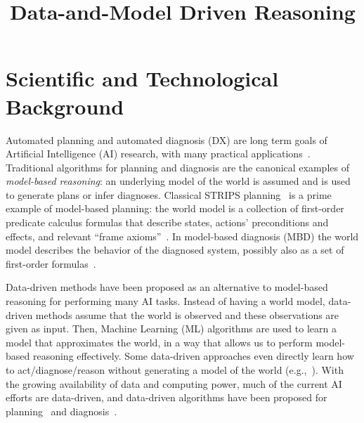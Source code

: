 \documentclass[12pt]{article}
\newcommand{\note}[1]{\textbf{\textit{#1}}}
\begin{document}
\title{Data-and-Model Driven Reasoning}


\section{Scientific and Technological Background}


Automated planning and automated diagnosis (DX) are long term goals of Artificial Intelligence (AI) research, with many practical applications~\cite{abreu2011simultaneousDebugging,fox2011automatic,niggemann10model,williams96,robinson2014cost,ruml2011line,Zamir2014UsingMD}. 
Traditional algorithms for planning and diagnosis are the canonical examples of {\em model-based reasoning}:
an underlying model of the world is assumed and is used to generate plans or infer diagnoses. 
Classical STRIPS planning~\cite{fikes1971strips} is a prime example of model-based planning: the world model is a collection of first-order predicate calculus formulas that describe states, actions' preconditions and effects, and relevant ``frame axioms''~\cite{ghallab2004automated}. In model-based diagnosis (MBD) the world model describes the behavior of the diagnosed system, 
possibly also as a set of first-order formulas~\cite{reiter1987theory,deKleer1987diagnosing}. 



Data-driven methods have been proposed as an alternative to model-based reasoning for performing many AI tasks. %
Instead of having a world model, data-driven methods  assume that the world is observed and these observations are given as input. Then, Machine Learning (ML) algorithms are used to learn a model that approximates the world, in a way that allows us to perform model-based reasoning effectively. Some data-driven approaches even directly learn how to act/diagnose/reason without generating a model of the world (e.g.,~\cite{kearns2002POMDPsample}). 
With the growing availability of data and computing power, much of the current AI efforts are data-driven,
and data-driven algorithms have been proposed for  planning~\cite{fern2011first,juba2016jmlr} and diagnosis~\cite{keren2011model,qin2012survey}.
\end{document}
